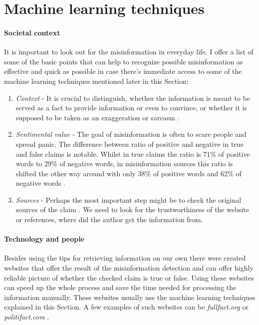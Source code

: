 \documentclass[11pt ,english,a4paper]{article}
\begin{document}
\section{Machine learning techniques} \label{tech}

\paragraph{Societal context}%
It is important to look out for the misinformation in everyday life.
I offer a list of some of the basic points that can help to recognize possible misinformation as effective and quick as possible in case there's immediate access to some of the machine learning techniques mentioned later in this Section: 
\begin{enumerate}
\item{\emph{Context}} - It is crucial to distinguish, whether the information is meant to be served as a fact to provide information or even to convince, or whether it is supposed to be taken as an exaggeration or sarcasm \cite{alh18fact}.
\item {\emph{Sentimental value}} - The goal of misinformation is often to scare people and spread panic. The difference between ratio of positive and negative in true and false claims is notable. Whilst in true claims the ratio is 71\% of positive words to 29\% of negative words, in misinformation sources this ratio is shifted the other way around with only 38\% of positive words and 62\% of negative words \cite{bar21health}.
\item {\emph{Sources}} - Perhaps the most important step might be to check the original sources of the claim \cite{gra17fact}. We need to look for the trustworthiness of the website or references, where did the author get the information from.
\end{enumerate}

\paragraph{Technology and people}%
Besides using the tips for retrieving information on our own there were created websites that offer the result of the misinformation detection and can offer highly reliable picture of whether the checked claim is true or false. Using these websites can speed up the whole process and save the time needed for processing the information manually. These websites usually use the machine learning techniques explained in this Section. A few examples of such websites can be \emph{fullfact.org} or \emph{politifact.com} \cite{alh18fact}.
\end{document}
